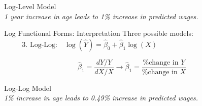 \documentclass{./../div_teaching_slides}
\begin{document}
\begin{frame}{Log-Level Model}
\centering \small \vspace{-0.5em}
 \\ \vspace{1.5em}
\normalsize \textit{1 year increase in age leads to 1\% increase in predicted wages.} 
\end{frame}

\begin{frame}{Log Functional Forms: Interpretation}
Three possible models:
$$\text{3. Log-Log:} \quad \log(\hat{Y}) = \hat{\beta}_0 +  \hat{\beta}_1 \log(X) \hspace{5cm}$$

$$\hat{\beta}_1 = \frac{dY/Y}{dX/X} \rightarrow \hat{\beta}_1 = \frac{\text{\% change in $Y$}}{\text{\% change in $X$}}  $$
\end{frame}

\begin{frame}{Log-Log Model}
\centering \small \vspace{-0.5em}
 \\ \vspace{1.5em}
\normalsize \textit{1\% increase in age leads to 0.49\% increase in predicted wages.} 
\end{frame}


\end{document}
